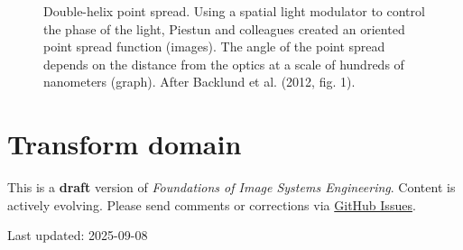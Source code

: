 \documentclass[
  letterpaper,
]{book}
\begin{document}
\begin{figure}


\caption{\label{fig-optics-double-helix}Double-helix point spread. Using
a spatial light modulator to control the phase of the light, Piestun and
colleagues created an oriented point spread function (images). The angle
of the point spread depends on the distance from the optics at a scale
of hundreds of nanometers (graph). After Backlund et al. (2012, fig.
1).}

\end{figure}%

\chapter{Transform domain}\label{sec-optics-linear-harmonics}

\begin{tcolorbox}[enhanced jigsaw, opacityback=0, breakable, coltitle=black, leftrule=.75mm, left=2mm, colframe=quarto-callout-warning-color-frame, opacitybacktitle=0.6, bottomtitle=1mm, bottomrule=.15mm, toprule=.15mm, title=\textcolor{quarto-callout-warning-color}{\faExclamationTriangle}\hspace{0.5em}{Work in Progress}, titlerule=0mm, toptitle=1mm, colback=white, rightrule=.15mm, colbacktitle=quarto-callout-warning-color!10!white, arc=.35mm]

This is a \textbf{draft} version of \emph{Foundations of Image Systems
Engineering}. Content is actively evolving. Please send comments or
corrections via \href{https://github.com/wandell/FISE-git/issues}{GitHub
Issues}.

Last updated: 2025-09-08

\end{tcolorbox}
\end{document}
